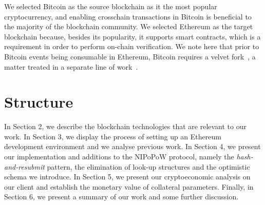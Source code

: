 We selected Bitcoin as the source blockchain as it the most popular cryptocurrency,
and enabling crosschain transactions in Bitcoin is beneficial to the
majority of the blockchain community. We selected Ethereum as the target blockchain
because, besides its popularity, it supports smart contracts, which is a
requirement in order to perform on-chain verification. We note here that
prior to Bitcoin events being consumable in Ethereum, Bitcoin requires a
velvet fork~\cite{velvet-fork}, a matter treated in a separate line of
work~\cite{velvet-nipopows}.

\section{Structure}

In Section 2, we describe the blockchain technologies that are relevant to our
work. In Section 3, we display the process of setting up an Ethereum
development environment and we analyse previous work. In Section 4, we present
our implementation and additions to the NIPoPoW protocol, namely the
\emph{hash-and-resubmit} pattern, the elimination of look-up structures and the
optimistic schema we introduce. In Section 5, we present our cryptoeconomic
analysis on our client and establish the monetary value of collateral
parameters. Finally, in Section 6, we present a summary of our work and some
further discussion.
